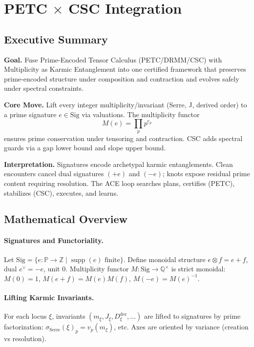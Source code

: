 \documentclass[12pt]{article}
\begin{document}
\section{PETC $\times$ CSC Integration}

\subsection{Executive Summary}
\textbf{Goal.} Fuse Prime-Encoded Tensor Calculus (PETC/DRMM/CSC) with Multiplicity as Karmic Entanglement into one certified framework that preserves prime-encoded structure under composition and contraction and evolves safely under spectral constraints.

\textbf{Core Move.} Lift every integer multiplicity/invariant (Serre, J, derived order) to a prime signature $e \in \mathrm{Sig}$ via valuations. The multiplicity functor
\[
M(e) = \prod_{p} p^{e_p}
\]
ensures prime conservation under tensoring and contraction. CSC adds spectral guards via a gap lower bound and slope upper bound.

\textbf{Interpretation.} Signatures encode archetypal karmic entanglements. Clean encounters cancel dual signatures $(+e)$ and $(-e)$; knots expose residual prime content requiring resolution. The ACE loop searches plans, certifies (PETC), stabilizes (CSC), executes, and learns.

\subsection{Mathematical Overview}

\paragraph{Signatures and Functoriality.} Let $\mathrm{Sig} = \{ e: \mathbb{P} \to \mathbb{Z} \mid \operatorname{supp}(e) \text{ finite} \}$. Define monoidal structure $e \otimes f = e+f$, dual $e^{\vee}=-e$, unit $0$. Multiplicity functor $M: \mathrm{Sig} \to \mathbb{Q}^\times$ is strict monoidal: $M(0)=1$, $M(e+f)=M(e)M(f)$, $M(-e)=M(e)^{-1}$.

\paragraph{Lifting Karmic Invariants.} For each locus $\xi$, invariants $(m_{\xi}, J_{\xi}, D^{\mathrm{der}}_{\xi}, \ldots)$ are lifted to signatures by prime factorization: $\sigma_{\mathrm{Serre}}(\xi)_p=v_p(m_{\xi})$, etc. Axes are oriented by variance (creation vs resolution).
\end{document}
